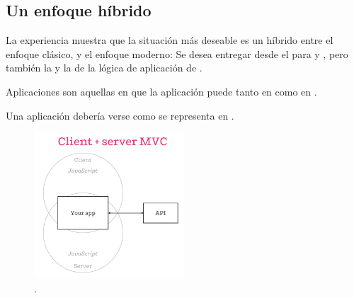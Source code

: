 \begin{itemize}
\end{itemize}


\subsection{Un enfoque híbrido}

La experiencia muestra que la situación más deseable es un híbrido entre el enfoque clásico, y el enfoque moderno: Se desea entregar \htmlNAME \fullyFormedCPT desde el \serverAS para \performanceQA y \seoINT, pero también la \speedQA y la \flexibilityQA de la lógica de aplicación de \clientSideAS.

Aplicaciones \isomorphicAS \javaScriptNAME son aquellas en que la aplicación \javaScriptNAME puede \runCPT tanto en \clientSideAS como en \serverSideAS.

Una aplicación \isomorphicAS debería verse como se representa en .

\begin{figure}[H]
	\centering
	\includegraphics[width=0.5\textwidth]{figuras/estadoArte/isomorphic-client-server-mvc.png}
	\caption{\isomorphicAS  \clientAS \serverAS \mvcAS.}
	\label{figure:isomorphic_client_server_mvc}
\end{figure}

